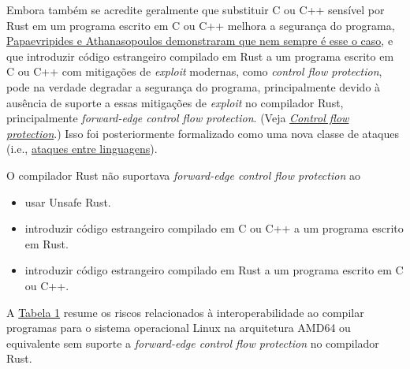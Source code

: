 \documentclass{article}
\begin{document}

Embora também se acredite geralmente que substituir C ou C++ sensível por Rust em um programa escrito em C ou C++ melhora a segurança do programa, \href{https://dl.acm.org/doi/pdf/10.1145/3418898}{Papaevripides e Athanasopoulos demonstraram que nem sempre é esse o caso}, e que introduzir código estrangeiro compilado em Rust a um programa escrito em C ou C++ com mitigações de \textit{exploit} modernas, como \textit{control flow protection}, pode na verdade degradar a segurança do programa, principalmente devido à ausência de suporte a essas mitigações de \textit{exploit} no compilador Rust, principalmente \textit{forward-edge control flow protection}. (Veja \hyperref[control-flow-protection]{\textit{Control flow protection}}.) Isso foi posteriormente formalizado como uma nova classe de ataques (i.e., \href{https://www.ndss-symposium.org/wp-content/uploads/2022-78-paper.pdf}{ataques entre linguagens}).

O compilador Rust não suportava \textit{forward-edge control flow protection} ao

\begin{itemize}
\item usar Unsafe Rust.
\item introduzir código estrangeiro compilado em C ou C++ a um programa escrito em Rust.
\item introduzir código estrangeiro compilado em Rust a um programa escrito em C ou C++.
\end{itemize}

A \hyperref[table1]{Tabela 1} resume os riscos relacionados à interoperabilidade ao compilar programas para o sistema operacional Linux na arquitetura AMD64 ou equivalente sem suporte a \textit{forward-edge control flow protection} no compilador Rust.
\end{document}

